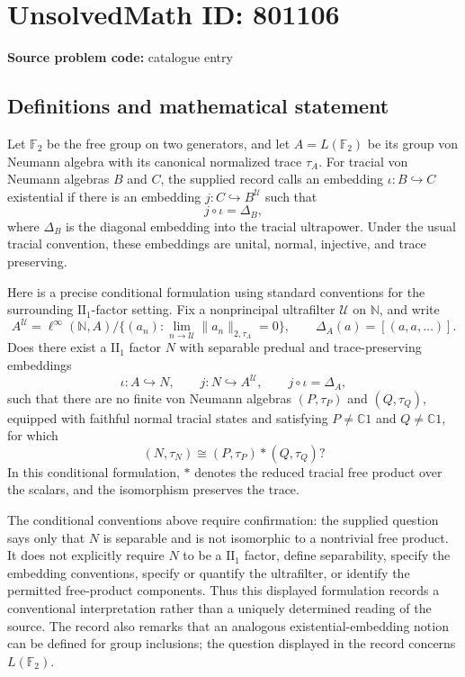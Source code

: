 \documentclass[11pt]{article}
\begin{document}
\section*{UnsolvedMath ID: 801106}
\textbf{Source problem code:} catalogue entry
\subsection{Definitions and mathematical statement}
Let \(\mathbb F_2\) be the free group on two generators, and let \(A=L(\mathbb F_2)\) be its group von Neumann algebra with its canonical normalized trace \(\tau_A\). For tracial von Neumann algebras \(B\) and \(C\), the supplied record calls an embedding \(\iota:B\hookrightarrow C\) existential if there is an embedding \(j:C\hookrightarrow B^{\mathcal U}\) such that
\[
j\circ\iota=\Delta_B,
\]
where \(\Delta_B\) is the diagonal embedding into the tracial ultrapower. Under the usual tracial convention, these embeddings are unital, normal, injective, and trace preserving.

Here is a precise conditional formulation using standard conventions for the surrounding \(\mathrm{II}_1\)-factor setting. Fix a nonprincipal ultrafilter \(\mathcal U\) on \(\mathbb N\), and write
\[
A^{\mathcal U}=\ell^\infty(\mathbb N,A)\big/\bigl\{(a_n):\lim_{n\to\mathcal U}\|a_n\|_{2,\tau_A}=0\bigr\},
\qquad \Delta_A(a)=[(a,a,\ldots)].
\]
Does there exist a \(\mathrm{II}_1\) factor \(N\) with separable predual and trace-preserving embeddings
\[
\iota:A\hookrightarrow N,
\qquad j:N\hookrightarrow A^{\mathcal U},
\qquad j\circ\iota=\Delta_A,
\]
such that there are no finite von Neumann algebras \((P,\tau_P)\) and \((Q,\tau_Q)\), equipped with faithful normal tracial states and satisfying \(P\ne\mathbb C1\) and \(Q\ne\mathbb C1\), for which
\[
(N,\tau_N)\cong(P,\tau_P)*(Q,\tau_Q)?
\]
In this conditional formulation, \(*\) denotes the reduced tracial free product over the scalars, and the isomorphism preserves the trace.

The conditional conventions above require confirmation: the supplied question says only that \(N\) is separable and is not isomorphic to a nontrivial free product. It does not explicitly require \(N\) to be a \(\mathrm{II}_1\) factor, define separability, specify the embedding conventions, specify or quantify the ultrafilter, or identify the permitted free-product components. Thus this displayed formulation records a conventional interpretation rather than a uniquely determined reading of the source. The record also remarks that an analogous existential-embedding notion can be defined for group inclusions; the question displayed in the record concerns \(L(\mathbb F_2)\).
\end{document}
